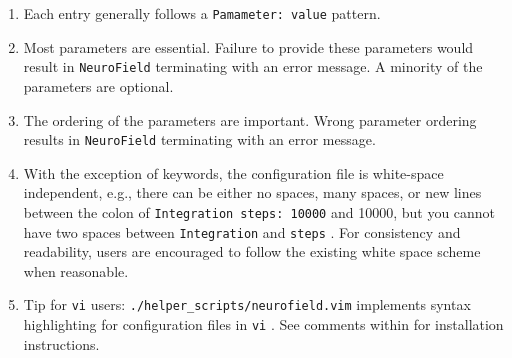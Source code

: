 \documentclass[12pt,a4paper]{article}
\newcommand{\type}[1]{ {\small\small\tt #1} }
\begin{document}
\begin{enumerate}
	\item Each entry generally follows a \type{Pamameter: value} pattern.
	\item Most parameters are essential. Failure to provide these parameters would result in \type{NeuroField} terminating with an error message. A minority of the parameters are optional.
	\item The ordering of the parameters are important. Wrong parameter ordering results in \type{NeuroField} terminating with an error message.
	\item With the exception of keywords, the configuration file is white-space independent, e.g., there can be either no spaces, many spaces, or new lines between the colon of \type{Integration steps: 10000} and 10000, but you cannot have two spaces between \type{Integration} and \type{steps}. For consistency and readability, users are encouraged to follow the existing white space scheme when reasonable.
	\item Tip for \type{vi} users: \type{./helper\_scripts/neurofield.vim} implements syntax highlighting for configuration files in \type{vi}. See comments within for installation instructions.
\end{enumerate}
\end{document}
